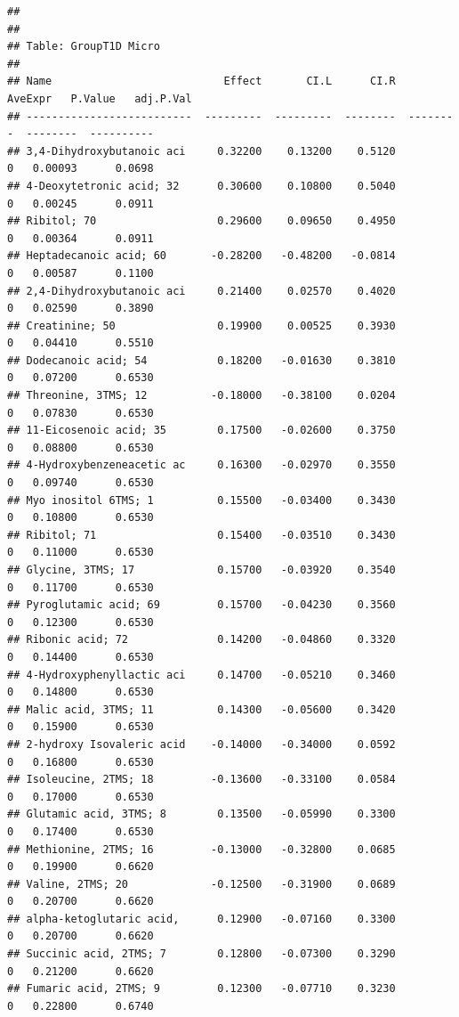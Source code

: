 \documentclass[]{article}
\begin{document}
\begin{verbatim}
## 
## 
## Table: GroupT1D Micro
## 
## Name                           Effect       CI.L      CI.R   AveExpr   P.Value   adj.P.Val
## --------------------------  ---------  ---------  --------  --------  --------  ----------
## 3,4-Dihydroxybutanoic aci     0.32200    0.13200    0.5120         0   0.00093      0.0698
## 4-Deoxytetronic acid; 32      0.30600    0.10800    0.5040         0   0.00245      0.0911
## Ribitol; 70                   0.29600    0.09650    0.4950         0   0.00364      0.0911
## Heptadecanoic acid; 60       -0.28200   -0.48200   -0.0814         0   0.00587      0.1100
## 2,4-Dihydroxybutanoic aci     0.21400    0.02570    0.4020         0   0.02590      0.3890
## Creatinine; 50                0.19900    0.00525    0.3930         0   0.04410      0.5510
## Dodecanoic acid; 54           0.18200   -0.01630    0.3810         0   0.07200      0.6530
## Threonine, 3TMS; 12          -0.18000   -0.38100    0.0204         0   0.07830      0.6530
## 11-Eicosenoic acid; 35        0.17500   -0.02600    0.3750         0   0.08800      0.6530
## 4-Hydroxybenzeneacetic ac     0.16300   -0.02970    0.3550         0   0.09740      0.6530
## Myo inositol 6TMS; 1          0.15500   -0.03400    0.3430         0   0.10800      0.6530
## Ribitol; 71                   0.15400   -0.03510    0.3430         0   0.11000      0.6530
## Glycine, 3TMS; 17             0.15700   -0.03920    0.3540         0   0.11700      0.6530
## Pyroglutamic acid; 69         0.15700   -0.04230    0.3560         0   0.12300      0.6530
## Ribonic acid; 72              0.14200   -0.04860    0.3320         0   0.14400      0.6530
## 4-Hydroxyphenyllactic aci     0.14700   -0.05210    0.3460         0   0.14800      0.6530
## Malic acid, 3TMS; 11          0.14300   -0.05600    0.3420         0   0.15900      0.6530
## 2-hydroxy Isovaleric acid    -0.14000   -0.34000    0.0592         0   0.16800      0.6530
## Isoleucine, 2TMS; 18         -0.13600   -0.33100    0.0584         0   0.17000      0.6530
## Glutamic acid, 3TMS; 8        0.13500   -0.05990    0.3300         0   0.17400      0.6530
## Methionine, 2TMS; 16         -0.13000   -0.32800    0.0685         0   0.19900      0.6620
## Valine, 2TMS; 20             -0.12500   -0.31900    0.0689         0   0.20700      0.6620
## alpha-ketoglutaric acid,      0.12900   -0.07160    0.3300         0   0.20700      0.6620
## Succinic acid, 2TMS; 7        0.12800   -0.07300    0.3290         0   0.21200      0.6620
## Fumaric acid, 2TMS; 9         0.12300   -0.07710    0.3230         0   0.22800      0.6740

\end{verbatim}
\end{document}
